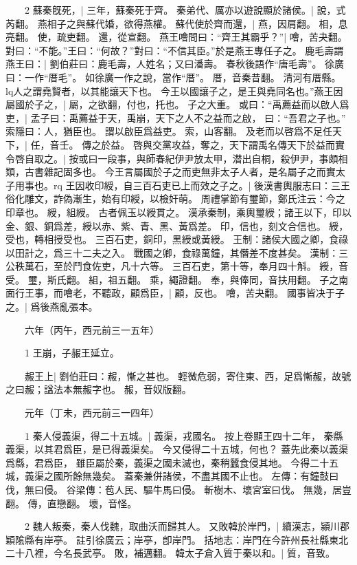 　　2 蘇秦旣死，|{
	三年，蘇秦死于齊。
}
秦弟代、厲亦以遊說顯於諸侯。|{
	說，式芮翻。
}
燕相子之與蘇代婚，欲得燕權。
	蘇代使於齊而還，|{
	燕，因肩翻。
	相，息亮翻。
	使，疏吏翻。
	還，從宣翻。
}
燕王噲問曰：“齊王其霸乎？”|{
	噲，苦夬翻。
}
對曰：“不能。”王曰：“何故？”對曰：“不信其臣。”於是燕王專任子之。
	鹿毛壽謂燕王曰：|{
	劉伯莊曰：鹿毛壽，人姓名；又曰潘壽。
	春秋後語作“唐毛壽”。
	徐廣曰：一作“厝毛”。
	如徐廣一作之說，當作“厝”。
	厝，音秦昔翻。
	清河有厝縣。
}
lq人之謂堯賢者，以其能讓天下也。
	今王以國讓子之，是王與堯同名也。”燕王因屬國於子之，|{
	屬，之欲翻，付也，托也。
}
子之大重。
	或曰：“禹薦益而以啟人爲吏，|{
	孟子曰：禹薦益于天，禹崩，天下之人不之益而之啟，
	曰：“吾君之子也。”
	索隱曰：人，猶臣也。
	謂以啟臣爲益吏。
	索，山客翻。
}
及老而以啓爲不足任天下，|{
	任，音壬。
}
傳之於益。
	啓與交黨攻益，奪之，天下謂禹名傳天下於益而實令啓自取之。|{
	按或曰一段事，與師春紀伊尹放太甲，潜出自桐，殺伊尹，事頗相類，古書雜記固多也。
}
今王言屬國於子之而吏無非太子人者，是名屬子之而實太子用事也。rq
王因收印綬，自三百石吏已上而效之子之。|{
	後漢書輿服志曰：三王俗化雕文，詐偽漸生，始有印綬，以檢奸萌。
	周禮掌節有璽節，鄭氏注云：今之印章也。
	綬，組綬。
	古者佩玉以綬貫之。
	漢承秦制，乘輿璽綬；諸王以下，印以金、銀、銅爲差，綬以赤、紫、青、黑、黃爲差。
	印，信也，刻文合信也。
	綬，受也，轉相授受也。
	三百石吏，銅印，黑綬或黃綬。
	王制：諸侯大國之卿，食祿以田計之，爲三十二夫之入。
	戰國之卿，食祿萬鐘，其僭差不度甚矣。
	漢制：三公秩萬石，至於鬥食佐吏，凡十六等。
	三百石吏，第十等，奉月四十斛。
	綬，音受。
	璽，斯氏翻。
	組，祖五翻。
	乘，繩證翻。
	奉，與俸同，音扶用翻。
}
子之南面行王事，而噲老，不聽政，顧爲臣，|{
	顧，反也。
	噲，苦夬翻。
}
國事皆决于子之。|{
	爲後燕亂張本。
}

　　六年（丙午，西元前三一五年）

　　1 王崩，子赧王延立。


　　赧王上|{
	劉伯莊曰：赧，慚之甚也。
	輕微危弱，寄住東、西，足爲慚赧，故號之曰赧；諡法本無赧字也。
	赧，音奴版翻。
}

　　元年（丁未，西元前三一四年）

　　1 秦人侵義渠，得二十五城。|{
	義渠，戎國名。
	按上卷顯王四十二年，
	秦縣義渠，以其君爲臣，是已得義渠矣。
	今又侵得二十五城，何也？
	蓋先此秦以義渠爲縣，君爲臣，
	雖臣屬於秦，義渠之國未滅也，秦稍蠶食侵其地。
	今得二十五城，義渠之國所餘無幾矣。
	蓋秦兼併諸侯，不盡其國不止也。
	左傳：有鐘鼓曰伐，無曰侵。
	谷梁傳：苞人民、驅牛馬曰侵。
	斬樹木、壞宮室曰伐。
	無幾，居豈翻。
	傳，直戀翻。
	壞，音怪。
}

　　2 魏人叛秦，秦人伐魏，取曲沃而歸其人。
	又敗韓於岸門，|{
	續漢志，潁川郡穎隂縣有岸亭。
	註引徐廣云；岸亭，卽岸門。
	括地志：岸門在今許州長社縣東北二十八裡，今名長武亭。
	敗，補邁翻。
}
韓太子倉入質于秦以和。|{
	質，音致。
}

